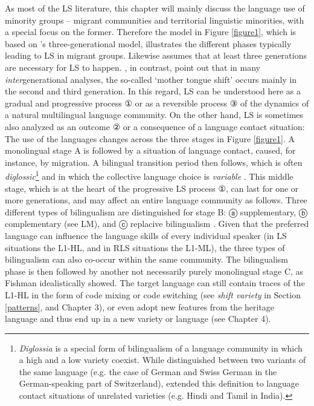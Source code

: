\documentclass[output=paper,
modfonts
]{langscibook}
\begin{document}
As most of the LS literature, this chapter will mainly discuss the language use of minority groups -- migrant communities and territorial linguistic minorities, with a special focus on the former. Therefore the model in Figure \ref{figure1}, which is based on \cite{Fishman1964}'s three-generational model, illustrates the different phases typically leading to LS in migrant groups. Likewise \cite{Weinreich1953} assumes that at least three generations are necessary for LS to happen. \cite[6]{Ortman2008}, in contrast, point out that in many \emph{inter}generational analyses, the so-called `mother tongue shift' occurs mainly in the second and third generation. In this regard, LS can be understood here as a gradual and progressive process ① or as a reversible process ③ of the dynamics of a natural multilingual language community. On the other hand, LS is sometimes also analyzed as an outcome ② or a consequence of a language contact situation: The use of the languages changes across the three stages in Figure \ref{figure1}. A monolingual stage A is followed by a situation of language contact, caused, for instance, by migration. A bilingual transition period then follows, which is often \emph{diglossic}\footnote{\emph{Diglossia} is a special form of bilingualism of a language community in which a high and a low variety coexist. While \cite{Ferguson1959} distinguished between two variants of the same language (e.g. the case of German and Swiss German in the German-speaking part of Switzerland), \cite{Fishman1967} extended this definition to language contact situations of unrelated varieties (e.g. Hindi and Tamil in India).} and in which the collective language choice is \emph{variable} \parencite{Fasold1984}. This middle stage, which is at the heart of the progressive LS process ①, can last for one or more generations, and may affect an entire language community as follows. Three different types of bilingualism are distinguished for stage B: ⓐ supplementary, ⓑ complementary  (see LM), and ⓒ replacive bilingualism \parencite{Haugen1972}. Given that the preferred language can influence the language skills of every individual speaker (in LS situations the L1-HL, and in RLS situations the L1-ML), the three types of bilingualism can also co-occur within the same community. The bilingualism phase is then followed by another not necessarily purely monolingual stage C, as Fishman \parencite*{Fishman1964} idealistically showed. The target language can still contain traces of the L1-HL in the form of code mixing or code switching (see \emph{shift variety} in Section \ref{patterns}, and Chapter 3), 
or even adopt new features from the heritage language and thus end up in a new variety or language (see Chapter 4).
\end{document}
